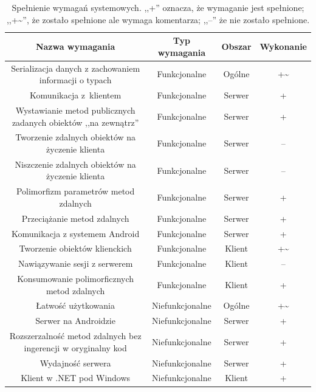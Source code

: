 \begin{table}[htbp]
	\begin{adjustbox}{center}
		\begin{tabular}{ @{}| c | c | c | c | }
			\hline
				\textbf{Nazwa wymagania} & \textbf{Typ wymagania} & \textbf{Obszar} & \textbf{Wykonanie}\\
				\hline \hline
				Serializacja danych z zachowaniem informacji o typach & Funkcjonalne & Ogólne & +\textasciitilde\\
				\hline
				
				Komunikacja z~klientem & Funkcjonalne & Serwer & +\\
				\hline
				Wystawianie metod publicznych zadanych obiektów ,,na zewnątrz'' & Funkcjonalne & Serwer & + \\
				\hline
				Tworzenie zdalnych obiektów na życzenie klienta & Funkcjonalne & Serwer & -- \\
				\hline
				Niszczenie zdalnych obiektów na życzenie klienta & Funkcjonalne & Serwer & -- \\
				\hline
				Polimorfizm parametrów metod zdalnych & Funkcjonalne & Serwer & + \\
				\hline
				Przeciążanie metod zdalnych & Funkcjonalne & Serwer & + \\
				\hline
				Komunikacja z systemem Android & Funkcjonalne & Serwer & + \\
				\hline
				
				Tworzenie obiektów klienckich & Funkcjonalne & Klient & +\textasciitilde \\
				\hline
				Nawiązywanie sesji z serwerem & Funkcjonalne & Klient & -- \\
				\hline
				Konsumowanie polimorficznych metod zdalnych & Funkcjonalne & Klient & + \\
				\hline
				
				Łatwość użytkowania & Niefunkcjonalne & Ogólne & +\textasciitilde \\
				\hline
				Serwer na Androidzie & Niefunkcjonalne & Serwer & + \\
				\hline
				Rozszerzalność metod zdalnych bez ingerencji w oryginalny kod & Niefunkcjonalne & Serwer & + \\
				\hline
				Wydajność serwera & Niefunkcjonalne & Serwer & + \\
				\hline
				Klient w .NET pod Windows & Niefunkcjonalne & Klient & + \\
				\hline
		\end{tabular}
	\end{adjustbox}
	\caption[Spełnienie wymagań systemowych.]{Spełnienie wymagań systemowych. ,,+'' oznacza, że wymaganie jest spełnione; ,,+\textasciitilde'', że zostało spełnione ale wymaga komentarza; ,,--'' że nie zostało spełnione.}
	\label{tab:requirements-fulfilment}
\end{table}

